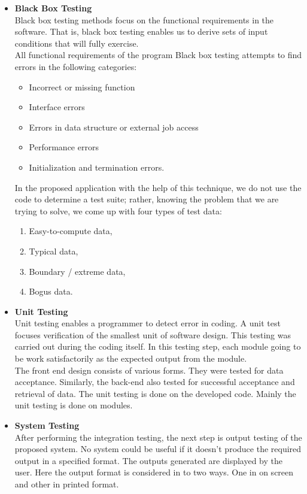 \begin{itemize}
\item \textbf{Black Box Testing}\\
Black box testing methods focus on the functional requirements in the software. That is, black box testing enables us to derive sets of input conditions that will fully exercise.\\
All functional requirements of the program Black box testing attempts to find errors in the following categories:
\begin{itemize}
\item Incorrect or missing function
\item	Interface errors
\item	Errors in data structure or external job access
\item	Performance errors
\item	Initialization and termination errors.
 
\end{itemize}
In the proposed application with the help of this technique, we do not use the code to determine a test suite; rather, knowing the problem that we are trying to solve, we come up with four types of test data: 
\begin{enumerate}
\item	Easy-to-compute data,
\item	Typical data,
\item	Boundary / extreme data,
\item	Bogus data.

\end{enumerate}

\item \textbf{Unit Testing}\\
Unit testing enables a programmer to detect error in coding. A unit test focuses verification of the smallest unit of software design. This testing was carried out during the coding itself. In this testing step, each module going to be work satisfactorily as the expected output from the module.\\

\noindent
The front end design consists of various forms. They were tested for data acceptance. Similarly, the back-end also tested for successful acceptance and retrieval of data. The unit testing is done on the developed code. Mainly the unit testing is done on modules.

\item \textbf{System Testing}\\
After performing the integration testing, the next step is output testing of the proposed system. No system could be useful if it doesn't produce the required output in a specified format. The outputs generated are displayed by the user. Here the output format is considered in to two ways. One in on screen and other in printed format.


\end{itemize}
